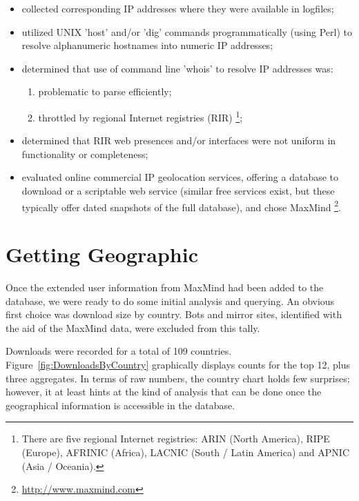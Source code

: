 \begin{itemize}

\item collected corresponding IP addresses where they were available in logfiles;

\item utilized UNIX 'host' and/or 'dig' commands programmatically (using Perl) to resolve alphanumeric
hostnames into numeric IP addresses;

\item determined that use of command line 'whois' to resolve IP addresses was:

\begin{enumerate}

\item problematic to parse efficiently;

\item throttled by regional Internet registries (RIR) \footnote{There are 
five regional Internet registries: ARIN (North America), RIPE (Europe), 
AFRINIC (Africa), LACNIC (South / Latin America) and APNIC (Asia / 
Oceania).};

\end{enumerate}

\item determined that RIR web presences and/or interfaces were not uniform in functionality or
completeness;

\item evaluated online commercial IP geo\-location services, offering a database 
to download or a scriptable web service (similar free services exist, but these 
typically offer dated snapshots of the full database), and chose 
MaxMind \footnote{\url{http://www.maxmind.com}}.

\end{itemize}

\section{Getting Geographic}

Once the extended user information from MaxMind had been added to the database, we
were ready to do some initial analysis and querying. An obvious first choice was download
size by country. Bots and mirror sites, identified with the aid of the MaxMind data, were
excluded from this tally.

Downloads were recorded for a total of 109 countries. Figure~\ref{fig:DownloadsByCountry} graphically displays counts
for the top 12, plus three aggregates. In terms of raw numbers, the country chart holds 
few surprises; however, it at least hints at the kind of analysis that can be done once 
the geographical information is accessible in the database.

